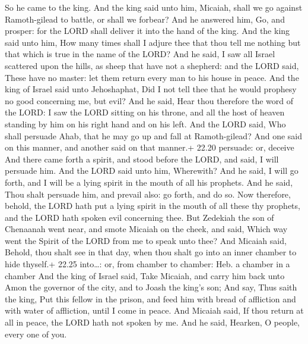  So he came to the king. And the king said unto him,
Micaiah, shall we go against Ramoth-gilead to battle, or shall we
forbear? And he answered him, Go, and prosper: for the LORD shall
deliver it into the hand of the king.  And the king said
unto him, How many times shall I adjure thee that thou tell me nothing
but that which is true in the name of the LORD?  And he
said, I saw all Israel scattered upon the hills, as sheep that have not
a shepherd: and the LORD said, These have no master: let them return
every man to his house in peace.  And the king of Israel
said unto Jehoshaphat, Did I not tell thee that he would prophesy no
good concerning me, but evil?  And he said, Hear thou
therefore the word of the LORD: I saw the LORD sitting on his throne,
and all the host of heaven standing by him on his right hand and on his
left.  And the LORD said, Who shall persuade Ahab, that he
may go up and fall at Ramoth-gilead? And one said on this manner, and
another said on that manner.+ 22.20 persuade: or, deceive 
And there came forth a spirit, and stood before the LORD, and said, I
will persuade him.  And the LORD said unto him, Wherewith?
And he said, I will go forth, and I will be a lying spirit in the mouth
of all his prophets. And he said, Thou shalt persuade him, and prevail
also: go forth, and do so.  Now therefore, behold, the LORD
hath put a lying spirit in the mouth of all these thy prophets, and the
LORD hath spoken evil concerning thee.  But Zedekiah the
son of Chenaanah went near, and smote Micaiah on the cheek, and said,
Which way went the Spirit of the LORD from me to speak unto thee?
 And Micaiah said, Behold, thou shalt see in that day, when
thou shalt go into an inner chamber to hide thyself.+ 22.25 into\ldots:
or, from chamber to chamber: Heb. a chamber in a chamber 
And the king of Israel said, Take Micaiah, and carry him back unto Amon
the governor of the city, and to Joash the king's son;  And
say, Thus saith the king, Put this fellow in the prison, and feed him
with bread of affliction and with water of affliction, until I come in
peace.  And Micaiah said, If thou return at all in peace,
the LORD hath not spoken by me. And he said, Hearken, O people, every
one of you.

